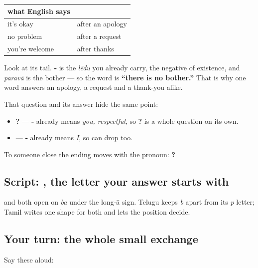 \noindent
\begin{tabularx}{\linewidth}{@{}>{\raggedright\arraybackslash}X>{\raggedright\arraybackslash}X@{}}
\toprule
\textbf{what English says} & \textbf{} \\
\midrule
it's okay & after an apology \\
no problem & after a request \\
you're welcome & after thanks \\
\bottomrule
\end{tabularx}

Look at its tail. \textbf{‑} is the \emph{lēdu} you already carry, the negative of existence, and \emph{paravā} is the bother — so the word is \textbf{\textquotedblleft{}there is no bother.\textquotedblright{}} That is why one word answers an apology, a request and a thank-you alike.

\begin{grammarlens}[title={Grammar Lens: the ending is already carrying the person}]
That question and its answer hide the same point:

\begin{itemize}
\raggedright
  \item \textbf{  ?} — \textbf{‑} already means \emph{you, respectful}, so \textbf{ ?} is a whole question on its own.
  \item \textbf{ } — \textbf{‑} already means \emph{I}, so \textbf{} can drop too.
\end{itemize}

To someone close the ending moves with the pronoun: \textbf{  ?}
\end{grammarlens}

\subsection*{Script: , the letter your answer starts with}
\begin{quote}
\end{quote}

\textbf{} and \textbf{} both open on \textbf{} \emph{ba} under the long‑ā sign. Telugu keeps \emph{b} apart from its \emph{p} letter; Tamil writes one shape for both and lets the position decide.

\subsection*{Your turn: the whole small exchange}
Say these aloud:

